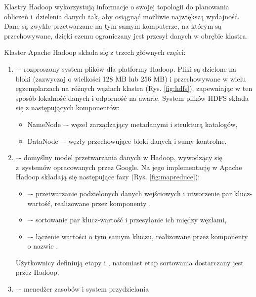 Klastry Hadoop wykorzystują informacje o swojej topologii do planowania obliczeń
i~dzielenia danych tak, aby osiągnąć możliwie największą wydajność. Dane są zwykle
przetwarzane na tym samym komputerze, na którym są przechowywane, dzięki czemu
ograniczany jest przesył danych w obrębie klastra. \newpage

Klaster Apache Hadoop składa się z trzech głównych części:
\begin{enumerate}
      \item {} –- rozproszony system plików dla
            platformy Hadoop. Pliki są dzielone na bloki (zazwyczaj o wielkości 128 MB lub 256 MB)
            i przechowywane w wielu egzemplarzach na różnych węzłach klastra (Rys. \ref{fig:hdfs}),
            zapewniając w ten sposób lokalność danych i odporność na awarie. System plików HDFS
            składa się z następujących komponentów:
            \begin{itemize}
                  \item NameNode –- węzeł zarządzający metadanymi i strukturą katalogów,
                  \item DataNode –- węzły przechowujące bloki danych i sumy kontrolne.
            \end{itemize}
      \item {} –- domyślny model przetwarzania danych w Hadoop, wywodzący się
            z~systemów opracowanych przez Google. Na jego implementację w Apache Hadoop składają
            się następujące fazy (Rys. \ref{fig:mapreduce}):
            \begin{itemize}
                  \item {} –- przetwarzanie podzielonych danych wejściowych i utworzenie
                        par klucz-wartość, realizowane przez komponenty ,
                  \item {} –- sortowanie par klucz-wartość i przesyłanie ich między węzłami,
                  \item {} –- łączenie wartości o tym samym kluczu, realizowane przez
                        komponenty o nazwie .
            \end{itemize}
            Użytkownicy definiują etapy  i , natomiast etap sortowania
            dostarczany jest przez Hadoop.
      \item {} –- menedżer zasobów i system przydzielania

\end{enumerate}
